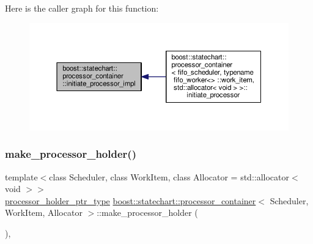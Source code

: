 Here is the caller graph for this function\+:
\nopagebreak
\begin{figure}[H]
\begin{center}
\leavevmode
\includegraphics[width=350pt]{classboost_1_1statechart_1_1processor__container_a990121e1344fde3e2b3735c7364805f9_icgraph}
\end{center}
\end{figure}
\mbox{\label{classboost_1_1statechart_1_1processor__container_a04c9968abd3eb95f1a6fcb171166c5f6}} 
\subsubsection{\texorpdfstring{make\+\_\+processor\+\_\+holder()}{make\_processor\_holder()}}
{\footnotesize\ttfamily template$<$class Scheduler, class Work\+Item, class Allocator = std\+::allocator$<$ void $>$$>$ \\
\mbox{\hyperlink{classboost_1_1statechart_1_1processor__container_a885e5a42694857bfaa44ec053ed20a57}{processor\+\_\+holder\+\_\+ptr\+\_\+type}} \mbox{\hyperlink{classboost_1_1statechart_1_1processor__container}{boost\+::statechart\+::processor\+\_\+container}}$<$ Scheduler, Work\+Item, Allocator $>$\+::make\+\_\+processor\+\_\+holder (\begin{DoxyParamCaption}{ }\end{DoxyParamCaption})\hspace{0.3cm}{\ttfamily [inline]}, {\ttfamily [private]}}

